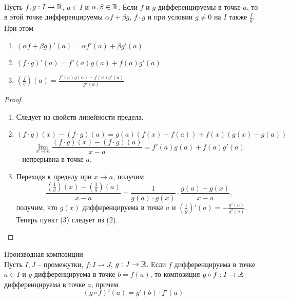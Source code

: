    \begin{theorem} \ \\
        Пусть $f, g: I \to \mathbb{R}$, $a \in I$ и $\alpha, \beta \in \mathbb{R}$.
        Если $f$ и $g$ дифференцируемы в точке $a$, то в этой точке дифференцируемы $\alpha f + \beta g$, $f \cdot g$ и при условии $g \neq 0$ на $I$ также $\frac{f}{g}$. При этом 
        \begin{enumerate}
            \item $(\alpha f + \beta g)'(a) = \alpha f'(a) + \beta g'(a)$
            \item $(f \cdot g)'(a) = f'(a)g(a) + f(a)g'(a)$
            \item $(\frac{f}{g})(a) = \frac{f'(a)g(a) - f(a)g'(a)}{g^{2}(a)}$
        \end{enumerate}
    \end{theorem}
    
    \begin{proof}
        \begin{enumerate}
            \item Следует из свойств линейности предела.
            \item \[(f \cdot g)(x) - (f \cdot g)(a) = g(a)(f(x) - f(a)) + f(x)(g(x) - g(a))\]
        \[\lim_{x \to a} \frac{(f \cdot g)(x) - (f \cdot g)(a)}{x - a} = f'(a) g(a) + f(a) g'(a)\]
        -- непрерывна в точке $a$.
            \item Переходя к пределу при $x \to a$, получим
        \[\frac{(\frac{1}{g})(x) - (\frac{1}{g})(a)}{x - a} = \frac{1}{g(a) \cdot g(x)} \cdot \frac{g(a) - g(x)}{x - a},\]
        получим, что $g(x)$ дифференцируема в точке $a$ и $(\frac{1}{g})'(a) = - \frac{g'(a)}{g^{2}(a)}$. Теперь пункт (3) следует из (2).
        \end{enumerate}
    \end{proof}
    
    \begin{theorem}{Производная композиции}\\
        Пусть $I, J$ -- промежутки, $f: I \to J$, $g: J \to \mathbb{R}$. Если $f$ дифференцируема в точке $a \in I$ и $g$ дифференцируема в точке $b = f(a)$, то композиция $g\circ f: I \to \mathbb{R}$ дифференцируема в точке $a$, причем
        \[(g\circ f)'(a) = g'(b) \cdot f'(a)\]
    \end{theorem}
    
